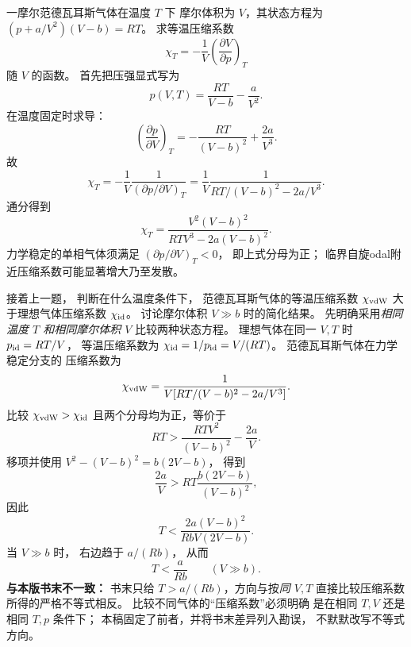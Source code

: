 一摩尔范德瓦耳斯气体在温度 $T$ 下
摩尔体积为 $V$，其状态方程为
$(p+a/V^2)(V-b)=RT$。
求等温压缩系数
\[
\chi_T=-\frac1V
\left(\frac{\partial V}{\partial p}\right)_T
\]
随 $V$ 的函数。
\exsolution
首先把压强显式写为
\[
p(V,T)=\frac{RT}{V-b}-\frac a{V^2}.
\]
在温度固定时求导：
\[
\left(\frac{\partial p}{\partial V}\right)_T
=-\frac{RT}{(V-b)^2}+\frac{2a}{V^3}.
\]
故
\[
\chi_T=-\frac1V
\frac{1}{(\partial p/\partial V)_T}
=\frac1V
\frac{1}{RT/(V-b)^2-2a/V^3}.
\]
通分得到
\[
\boxed{\chi_T=
\frac{V^2(V-b)^2}
{RTV^3-2a(V-b)^2}}.
\]
\excheck 力学稳定的单相气体须满足
$(\partial p/\partial V)_T<0$，
即上式分母为正；
临界自旋odal附近压缩系数可能显著增大乃至发散。

接着上一题，
判断在什么温度条件下，
范德瓦耳斯气体的等温压缩系数
$\chi_{\rm vdW}$ 大于理想气体压缩系数
$\chi_{\rm id}$。
讨论摩尔体积 $V\gg b$ 时的简化结果。
\exsolution
先明确采用\emph{相同温度 $T$ 和相同摩尔体积 $V$}
比较两种状态方程。
理想气体在同一 $V,T$ 时
$p_{\rm id}=RT/V$，
等温压缩系数为
$\chi_{\rm id}=1/p_{\rm id}=V/(RT)$。
范德瓦耳斯气体在力学稳定分支的
压缩系数为
\[
\chi_{\rm vdW}
=\frac1{V[RT/(V-b)^2-2a/V^3]}.
\]
比较
$\chi_{\rm vdW}>\chi_{\rm id}$
且两个分母均为正，等价于
\[
RT>\frac{RTV^2}{(V-b)^2}-\frac{2a}{V}.
\]
移项并使用
$V^2-(V-b)^2=b(2V-b)$，
得到
\[
\frac{2a}{V}>
RT\frac{b(2V-b)}{(V-b)^2},
\]
因此
\[
\boxed{T<
\frac{2a(V-b)^2}{RbV(2V-b)}}.
\]
当 $V\gg b$ 时，
右边趋于 $a/(Rb)$，
从而
\[
\boxed{T<\frac{a}{Rb}\qquad(V\gg b)}.
\]
\excheck \textbf{与本版书末不一致：}
书末只给 $T>a/(Rb)$，方向与按\emph{同 $V,T$}
直接比较压缩系数所得的严格不等式相反。
比较不同气体的“压缩系数”必须明确
是在相同 $T,V$ 还是相同 $T,p$ 条件下；
本稿固定了前者，并将书末差异列入勘误，
不默默改写不等式方向。
